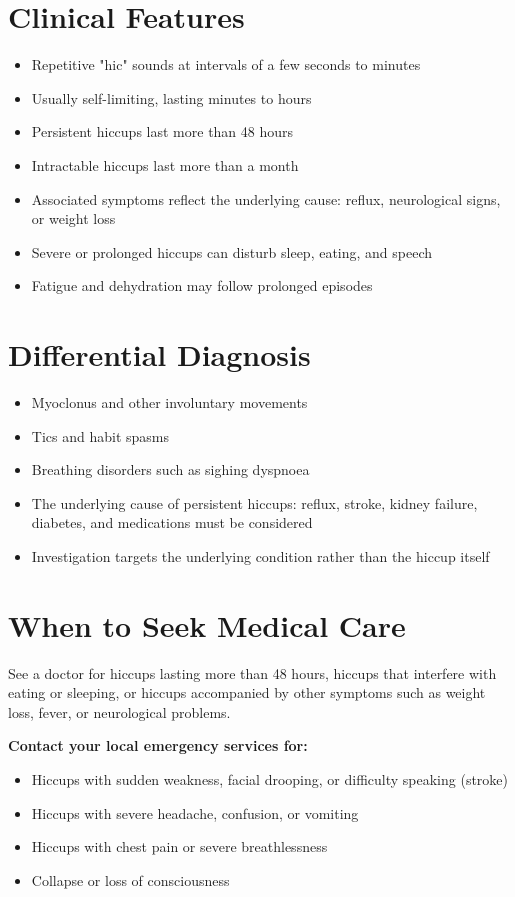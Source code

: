 \section*{Clinical Features}
\begin{itemize}
    \item Repetitive "hic" sounds at intervals of a few seconds to minutes
    \item Usually self-limiting, lasting minutes to hours
    \item Persistent hiccups last more than 48 hours
    \item Intractable hiccups last more than a month
    \item Associated symptoms reflect the underlying cause: reflux, neurological signs, or weight loss
    \item Severe or prolonged hiccups can disturb sleep, eating, and speech
    \item Fatigue and dehydration may follow prolonged episodes
\end{itemize}

\section*{Differential Diagnosis}
\begin{itemize}
    \item Myoclonus and other involuntary movements
    \item Tics and habit spasms
    \item Breathing disorders such as sighing dyspnoea
    \item The underlying cause of persistent hiccups: reflux, stroke, kidney failure, diabetes, and medications must be considered
    \item Investigation targets the underlying condition rather than the hiccup itself
\end{itemize}

\section*{When to Seek Medical Care}
See a doctor for hiccups lasting more than 48 hours, hiccups that interfere with eating or sleeping, or hiccups accompanied by other symptoms such as weight loss, fever, or neurological problems.

\textbf{Contact your local emergency services for:}
\begin{itemize}
    \item Hiccups with sudden weakness, facial drooping, or difficulty speaking (stroke)
    \item Hiccups with severe headache, confusion, or vomiting
    \item Hiccups with chest pain or severe breathlessness
    \item Collapse or loss of consciousness
\end{itemize}

